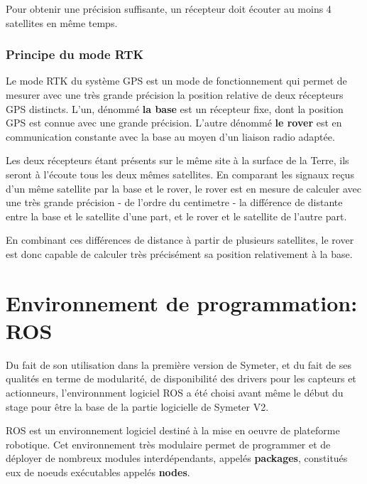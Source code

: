 \documentclass[12pt,a4paper]{report}
\begin{document}
		\para Pour obtenir une précision suffisante, un récepteur doit écouter au moins 4 satellites en même temps.
		
		
		\subsubsection{Principe du mode RTK}
		Le mode RTK du système GPS est un mode de fonctionnement qui permet de mesurer avec une très grande précision la position relative de deux récepteurs GPS distincts. L'un, dénommé \textbf{la base} est un récepteur fixe, dont la position GPS est connue avec une grande précision. L'autre dénommé \textbf{le rover} est en communication constante avec la base au moyen d'un liaison radio adaptée.
		
		\para Les deux récepteurs étant présents sur le même site à la surface de la Terre, ils seront à l'écoute tous les deux mêmes satellites. En comparant les signaux reçus d'un même satellite par la base et le rover, le rover est en mesure de calculer avec une très grande précision - de l'ordre du centimetre - la différence de distante entre la base et le satellite d'une part, et le rover et le satellite de l'autre part. 
		
		
		\para En combinant ces différences de distance à partir de plusieurs satellites, le rover est donc capable de calculer très précisément sa position relativement à la base.
	
		
		
		
		
	\section{Environnement de programmation: ROS}
	Du fait de son utilisation dans la première version de Symeter, et du fait de ses qualités en terme de modularité, de disponibilité des drivers pour les capteurs et actionneurs, l'environnment logiciel ROS a été choisi avant même le début du stage pour être la base de la partie logicielle de Symeter V2.
	
	
	\para ROS est un environnement logiciel destiné à la mise en oeuvre de plateforme robotique. Cet environnement très modulaire permet de programmer et de déployer de nombreux modules interdépendants, appelés \textbf{packages}, constitués eux de noeuds exécutables appelés \textbf{nodes}.
	
\end{document}
